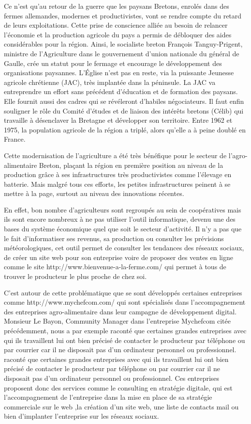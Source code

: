 \documentclass[a4paper,10pt]{report}
\begin{document}
			Ce n’est qu’au retour de la guerre que les paysans Bretons, enrolés dans des fermes allemandes, modernes et productivistes, vont se rendre compte du retard de leurs exploitations. Cette prise de conscience alliée au besoin de relancer l’économie et la production agricole du pays a permis de débloquer des aides considérables pour la région. Ainsi, le socialiste breton François Tanguy-Prigent, ministre de l'Agriculture dans le gouvernement d'union nationale du général de Gaulle, crée un statut pour le fermage et encourage le développement des organisations paysannes. L'Église n'est pas en reste, via la puissante Jeunesse agricole chrétienne (JAC), très implantée dans la péninsule. La JAC va entreprendre un effort sans précédent d'éducation et de formation des paysans. Elle fournit aussi des cadres qui se révéleront d'habiles négociateurs. Il faut enfin souligner le rôle du Comité d'études et de liaison des intérêts bretons (Célib) qui travaille à désenclaver la Bretagne et développer son territoire. Entre 1962 et 1975, la population agricole de la région a triplé, alors qu’elle a à peine doublé en France.
			
			Cette modernisation de l’agriculture a été très bénéfique pour le secteur de l’agro-alimentaire Breton, plaçant la région en première position au niveau de la production grâce à ses infrastructures très productivistes comme l’élevage en batterie. Mais malgré tous ces efforts, les petites infrastructures peinent à se mettre à la page, surtout au niveau des innovations récentes. 
			
			En effet, bon nombre d’agriculteurs sont regroupés au sein de coopératives mais ils sont encore nombreux à ne pas utiliser l’outil informatique, devenu une des bases du système économique quel que soit le secteur d’activité. Il n’y a pas que le fait d’informatiser ses revenus, sa production ou consulter les prévisions météorologiques, cet outil permet de consulter les tendances des réseaux sociaux, de créer un site web pour son entreprise voire de proposer des ventes en ligne comme le site http://www.bienvenue-a-la-ferme.com/ qui permet à tous de trouver le producteur le plus proche de chez soi.
			
			C’est autour de cette problématique que se sont développés certaines entreprises comme http://www.mychefcom.com/ qui sont spécialisés dans l’accompagnement des entreprises agro-alimentaire dans leur campagne de développement digital. Monsieur Le Bayon, Community Manager dans l’entreprise Mychefcom citée précédemment, nous a par exemple raconté que certaines grandes entreprises avec qui ils travaillent lui ont bien précisé de contacter le producteur par téléphone ou par courrier car il ne disposait pas d’un ordinateur personnel ou professionnel. raconté que certaines grandes entreprises avec qui ils travaillent lui ont bien précisé de contacter le producteur par téléphone ou par courrier car il ne disposait pas d’un ordinateur personnel ou professionnel. Ces entreprises proposent donc des services comme le consulting en stratégie digitale, qui est l’accompagnement de l’entreprise dans la mise en place de sa stratégie commerciale sur le web ,la création d’un site web, une liste de contacts mail ou bien d’implanter l’entreprise sur les réseaux sociaux.
			
\end{document}
